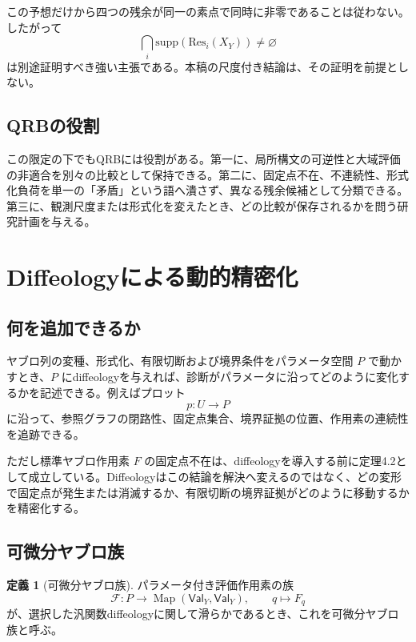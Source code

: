 \documentclass[a4paper,11pt]{ltjsarticle}
\theoremstyle{definition}
\newtheorem{definition}{定義}[section]
\theoremstyle{plain}
\newcommand{\Val}{\mathsf{Val}}
\newcommand{\Res}{\mathrm{Res}}
\newcommand{\supp}{\mathrm{supp}}
\begin{document}
この予想だけから四つの残余が同一の素点で同時に非零であることは従わない。したがって
\begin{equation}
 \bigcap_i\supp(\Res_i(X_Y))\neq\varnothing
\end{equation}
は別途証明すべき強い主張である。本稿の尺度付き結論は、その証明を前提としない。

\subsection{QRBの役割}

この限定の下でもQRBには役割がある。第一に、局所構文の可逆性と大域評価の非適合を別々の比較として保持できる。第二に、固定点不在、不連続性、形式化負荷を単一の「矛盾」という語へ潰さず、異なる残余候補として分類できる。第三に、観測尺度または形式化を変えたとき、どの比較が保存されるかを問う研究計画を与える。

\section{Diffeologyによる動的精密化}

\subsection{何を追加できるか}

ヤブロ列の変種、形式化、有限切断および境界条件をパラメータ空間 $P$ で動かすとき、$P$ にdiffeologyを与えれば、診断がパラメータに沿ってどのように変化するかを記述できる。例えばプロット
\begin{equation}
 p:U\longrightarrow P
\end{equation}
に沿って、参照グラフの閉路性、固定点集合、境界証拠の位置、作用素の連続性を追跡できる。

ただし標準ヤブロ作用素 $F$ の固定点不在は、diffeologyを導入する前に定理4.2として成立している。Diffeologyはこの結論を解決へ変えるのではなく、どの変形で固定点が発生または消滅するか、有限切断の境界証拠がどのように移動するかを精密化する。

\subsection{可微分ヤブロ族}

\begin{definition}[可微分ヤブロ族]
パラメータ付き評価作用素の族
\begin{equation}
 \mathcal F:P\longrightarrow
 \operatorname{Map}(\Val_Y,\Val_Y),
 \qquad q\longmapsto F_q
\end{equation}
が、選択した汎関数diffeologyに関して滑らかであるとき、これを可微分ヤブロ族と呼ぶ。
\end{definition}
\end{document}
